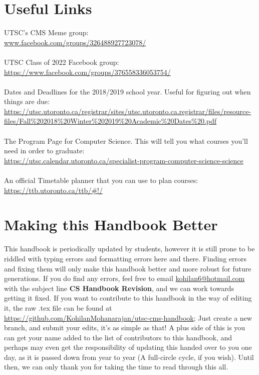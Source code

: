\documentclass[11pt]{article}
\begin{document}
\section{Useful Links}
UTSC's CMS Meme group:\\ \url{www.facebook.com/groups/326488927723078/}\\\\
UTSC Class of 2022 Facebook group:\\ \url{https://www.facebook.com/groups/376558336053754/}\\\\
Dates and Deadlines for the 2018/2019 school year.  Useful for figuring out when things are due:\\ \url{https://utsc.utoronto.ca/registrar/sites/utsc.utoronto.ca.registrar/files/resource-files/Fall%202018%20Winter%202019%20Academic%20Dates%20.pdf}\\\\
The Program Page for Computer Science.  This will tell you what courses you'll need in order to graduate:\\ \url{https://utsc.calendar.utoronto.ca/specialist-program-computer-science-science}\\\\
An official Timetable planner that you can use to plan courses:\\
\url{https://ttb.utoronto.ca/ttb/#!/}

\section{Making this Handbook Better}
This handbook is periodically updated by students, however it is still prone to be riddled with typing errors and formatting errors here and there.  Finding errors and fixing them will only make this handbook better and more robust for future generations.  If you do find any errors, feel free to email \href{ mailto:kohilan6@hotmail.com}{kohilan6@hotmail.com} with the subject line \textbf{CS Handbook Revision}, and we can work towards getting it fixed. If you want to contribute to this handbook in the way of editing it, the raw .tex file can be found at \url{https://github.com/KohilanMohanarajan/utsc-cms-handbook}; Just create a new branch, and submit your edits, it's as simple as that!  A plus side of this is you can get your name added to the list of contributors to this handbook, and perhaps may even get the responsibility of updating this handed over to you one day, as it is passed down from year to year (A full-circle cycle, if you wish).  Until then, we can only thank you for taking the time to read through this all.
\end{document}
